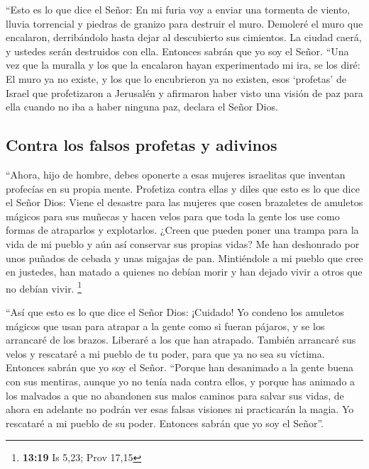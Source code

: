  ``Esto es lo que dice el Señor: En mi furia voy a enviar
una tormenta de viento, lluvia torrencial y piedras de granizo para
destruir el muro.  Demoleré el muro que encalaron,
derribándolo hasta dejar al descubierto sus cimientos. La ciudad caerá,
y ustedes serán destruidos con ella. Entonces sabrán que yo soy el
Señor.  ``Una vez que la muralla y los que la encalaron
hayan experimentado mi ira, se los diré: El muro ya no existe, y los que
lo encubrieron ya no existen,  esos `profetas' de Israel
que profetizaron a Jerusalén y afirmaron haber visto una visión de paz
para ella cuando no iba a haber ninguna paz, declara el Señor Dios.

\hypertarget{contra-los-falsos-profetas-y-adivinos}{%
\subsection{Contra los falsos profetas y
adivinos}\label{contra-los-falsos-profetas-y-adivinos}}

 ``Ahora, hijo de hombre, debes oponerte a esas mujeres
israelitas que inventan profecías en su propia mente. Profetiza contra
ellas  y diles que esto es lo que dice el Señor Dios:
Viene el desastre para las mujeres que cosen brazaletes de amuletos
mágicos para sus muñecas y hacen velos para que toda la gente los use
como formas de atraparlos y explotarlos. ¿Creen que pueden poner una
trampa para la vida de mi pueblo y aún así conservar sus propias vidas?
 Me han deshonrado por unos puñados de cebada y unas
migajas de pan. Mintiéndole a mi pueblo que cree en justedes, han matado
a quienes no debían morir y han dejado vivir a otros que no debían
vivir. \footnote{\textbf{13:19} Is 5,23; Prov 17,15}

 ``Así que esto es lo que dice el Señor Dios: ¡Cuidado!
Yo condeno los amuletos mágicos que usan para atrapar a la gente como si
fueran pájaros, y se los arrancaré de los brazos. Liberaré a los que han
atrapado.  También arrancaré sus velos y rescataré a mi
pueblo de tu poder, para que ya no sea su víctima. Entonces sabrán que
yo soy el Señor.  ``Porque han desanimado a la gente
buena con sus mentiras, aunque yo no tenía nada contra ellos, y porque
has animado a los malvados a que no abandonen sus malos caminos para
salvar sus vidas,  de ahora en adelante no podrán ver
esas falsas visiones ni practicarán la magia. Yo rescataré a mi pueblo
de su poder. Entonces sabrán que yo soy el Señor''.

